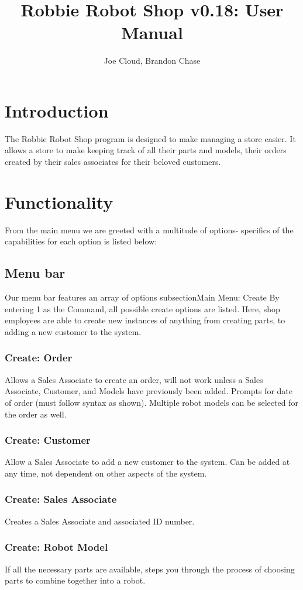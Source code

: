 \documentclass{article}
\title{Robbie Robot Shop v0.18: User Manual}
\author{Joe Cloud, Brandon Chase}
\begin{document}
\maketitle 

\section{Introduction}

The Robbie Robot Shop program is designed to make managing a store easier. It allows a store to make keeping track of all their parts and models, their orders created by their sales associates for their beloved customers. 

\section{Functionality}
From the main menu we are greeted with a multitude of options- specifics of the capabilities for each option is listed below:
\subsection{Menu bar}
Our menu bar features an array of options 
subsection{Main Menu: Create}
By entering 1 as the Command, all possible create options are listed. Here, shop employees are able to create new instances of anything from creating parts, to adding a new customer to the system.
\subsubsection{Create: Order}
Allows a Sales Associate to create an order, will not work unless a Sales Associate, Customer, and Models have previously been added.
Prompts for date of order (must follow syntax as shown). Multiple robot models can be selected for the order as well.
\subsubsection{Create: Customer}
Allow a Sales Associate to add a new customer to the system.
Can be added at any time, not dependent on other aspects of the system.
\subsubsection{Create: Sales Associate}
Creates a Sales Associate and associated ID number.
\subsubsection{Create: Robot Model}
If all the necessary parts are available, steps you through the process of choosing parts to combine together into a robot.
\end{document}
